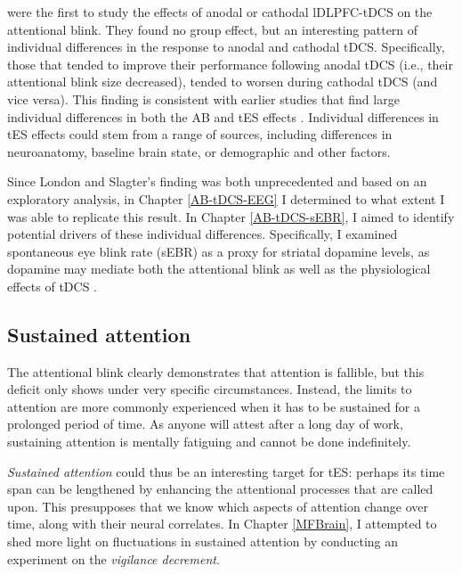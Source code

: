 \documentclass[11pt,english,]{memoir}
\begin{document}
\textcite{London2015} were the first to study the effects of anodal or cathodal lDLPFC-tDCS on the attentional blink. They found no group effect, but an interesting pattern of individual differences in the response to anodal and cathodal tDCS. Specifically, those that tended to improve their performance following anodal tDCS (i.e., their attentional blink size decreased), tended to worsen during cathodal tDCS (and vice versa). This finding is consistent with earlier studies that find large individual differences in both the AB \autocite{Willems2016} and tES effects \autocites{Krause2014}{Li2015b}. Individual differences in tES effects could stem from a range of sources, including differences in neuroanatomy, baseline brain state, or demographic and other factors.

Since London and Slagter's \autocite*{London2015} finding was both unprecedented and based on an exploratory analysis, in Chapter \ref{AB-tDCS-EEG} I determined to what extent I was able to replicate this result. In Chapter \ref{AB-tDCS-sEBR}, I aimed to identify potential drivers of these individual differences. Specifically, I examined spontaneous eye blink rate (sEBR) as a proxy for striatal dopamine levels, as dopamine may mediate both the attentional blink \autocite{Jongkees2016} as well as the physiological effects of tDCS \autocite{Stagg2018}.

\hypertarget{sustained-attention}{%
\subsection{Sustained attention}\label{sustained-attention}}

The attentional blink clearly demonstrates that attention is fallible, but this deficit only shows under very specific circumstances. Instead, the limits to attention are more commonly experienced when it has to be sustained for a prolonged period of time. As anyone will attest after a long day of work, sustaining attention is mentally fatiguing \autocites{Ackerman2011}{Hockey2013} and cannot be done indefinitely.

\emph{Sustained attention} could thus be an interesting target for tES: perhaps its time span can be lengthened by enhancing the attentional processes that are called upon. This presupposes that we know which aspects of attention change over time, along with their neural correlates. In Chapter \ref{MFBrain}, I attempted to shed more light on fluctuations in sustained attention by conducting an experiment on the \emph{vigilance decrement}.
\end{document}
